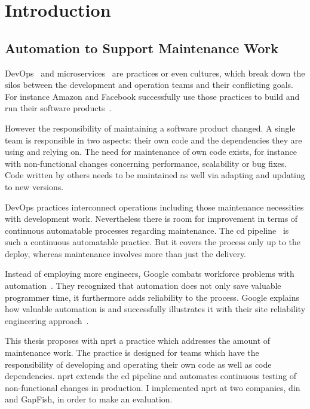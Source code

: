 \chapter{Introduction}
\label{chap:intro}
\section{Automation to Support Maintenance Work}

DevOps~\cite{devops_definition} and microservices~\cite{microservices_fowler} are
practices or even cultures, which break down the silos between the development and
operation teams and their conflicting goals. For instance Amazon and Facebook successfully
use those practices to build and run their software products~\cite{build_run,dev_at_fb}.

However the responsibility of maintaining a software product changed. A single team is
responsible in two aspects: their own code and the dependencies they are using and relying
on. The need for maintenance of own code exists, for instance with non-functional changes
concerning performance, scalability or bug fixes. Code written by others needs to be
maintained as well via adapting and updating to new versions.

DevOps practices interconnect operations including those maintenance necessities with
development work. Nevertheless there is room for improvement in terms of continuous
automatable processes regarding maintenance. The \gls{cd}
pipeline~\cite{cd_humble_pipeline} is such a continuous automatable practice. But it
covers the process only up to the deploy, whereas maintenance involves more than just the
delivery.

Instead of employing more engineers, Google combats workforce problems with
automation~\cite{sre_automation}. They recognized that automation does not only save
valuable programmer time, it furthermore adds reliability to the process. Google explains
how valuable automation is and successfully illustrates it with their site reliability
engineering approach~\cite{sre_intro}.

This thesis proposes with \gls{nprt} a practice which addresses the amount of maintenance
work. The practice is designed for teams which have the responsibility of developing and
operating their own code as well as code dependencies. \gls{nprt} extends the \gls{cd}
pipeline and automates continuous testing of non-functional changes in production. I
implemented \gls{nprt} at two companies, \gls{din} and GapFish, in order to make an
evaluation.

